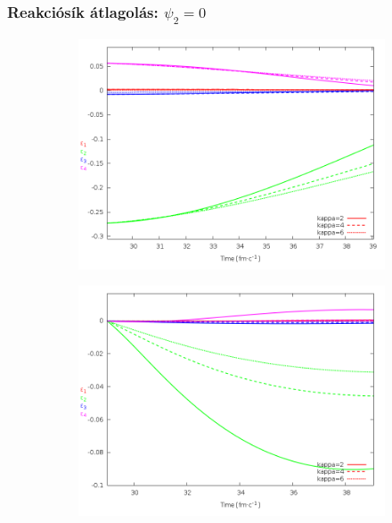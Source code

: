 \documentclass{beamer}
\begin{document}
\begin{frame}
\frametitle{Reakciósík átlagolás: $\psi_2=0$}
\begin{center}
\begin{itemize}
\setlength{\itemsep}{12pt}

\end{itemize}
\begin{figure}[H]
	\centering
    \begin{subfigure}[b]{0.49\textwidth}
    		\includegraphics[width=\textwidth]{pic/summer/avg_Psi2_p}
	\end{subfigure}
	\begin{subfigure}[b]{0.49\textwidth}
        	\includegraphics[width=\textwidth]{pic/summer/avg_Psi2_v}
	\end{subfigure}
\end{figure}
\end{center}
\end{frame}
\end{document}
